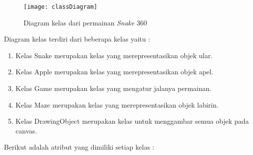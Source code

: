 \begin{figure}[H]
	\centering  
	\texttt{[image: classDiagram]}  
	\caption[Diagram class dari permainan \textit{Snake} 360]{Diagram kelas dari permainan \textit{Snake} 360}
	\label{fig:classDiagram} 
\end{figure}

Diagram kelas terdiri dari beberapa kelas yaitu :

\begin{enumerate}
	\item Kelas Snake merupakan  kelas yang merepresentasikan objek ular.
	\item Kelas Apple merupakan kelas yang merepresentasikan objek apel.
	\item Kelas Game merupakan kelas yang mengatur jalanya permainan.
	\item Kelas Maze merupakan kelas yang merepresentasikan objek labirin.
	\item Kelas DrawingObject merupakan kelas untuk menggambar semua objek pada canvas.
\end{enumerate}

Berikut adalah atribut yang dimiliki setiap kelas :

